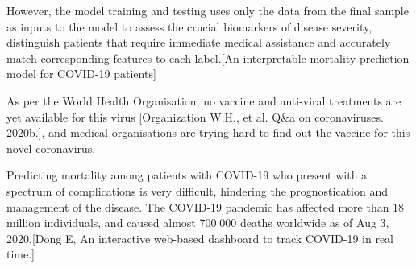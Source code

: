
\iffalse 

However, the model training and testing uses only the data from the final sample as inputs to the model to assess the crucial biomarkers of disease severity, distinguish patients that require immediate medical assistance and accurately match corresponding features to each label.[An interpretable mortality prediction model for COVID-19 patients]

As per the World Health Organisation, no vaccine and anti-viral treatments are yet available for this virus [Organization W.H., et al. Q&a on coronaviruses. 2020b.], and medical organisations are trying hard to find out the vaccine for this novel coronavirus.

Predicting mortality among patients with COVID-19 who present with a spectrum of complications is very difficult, hindering the prognostication and management of the disease.
The COVID-19 pandemic has affected more than 18 million individuals, and caused almost 700 000 deaths worldwide as of Aug 3, 2020.[Dong E, An interactive web-based dashboard to track COVID-19 in real time.]

